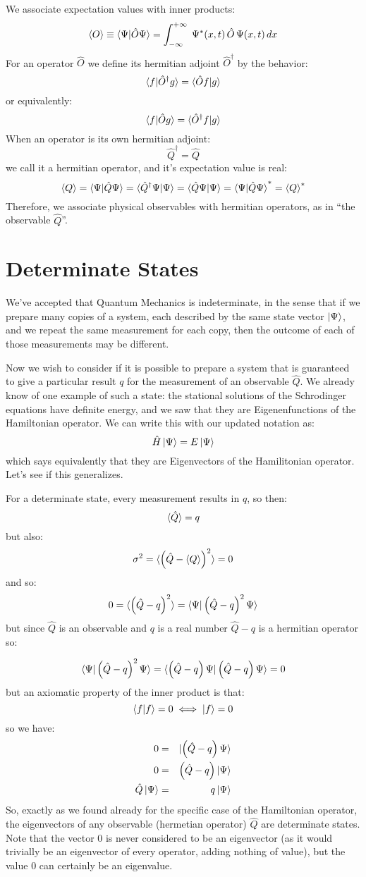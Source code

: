 \documentclass[12pt]{book}
\begin{document}
We associate expectation values with inner products:
$$\braket{O} \equiv \braket{\Psi|\hat{O}\Psi} = \int_{-\infty}^{+\infty}\; \Psi^*(x,t) \, \hat{O} \, \Psi(x,t) \, dx$$
For an operator $\hat{O}$ we define its hermitian adjoint $\hat{O}^\dagger$ by the behavior:
$$\braket{f|\hat{O}^\dagger g} = \braket{\hat{O} f| g}$$
or equivalently:
$$\braket{f|\hat{O} g} = \braket{\hat{O}^\dagger f| g}$$
When an operator is its own hermitian adjoint:
$$\hat{Q}^\dagger = \hat{Q}$$
we call it a hermitian operator, and it's expectation value is real:
$$\braket{Q} = \braket{\Psi|\hat{Q}\Psi} = \braket{\hat{Q}^\dagger \Psi|\Psi}=\braket{\hat{Q}\Psi|\Psi}=\braket{\Psi|\hat{Q}\Psi}^* = \braket{Q}^*$$
Therefore, we associate physical observables with hermitian operators, as in ``the observable $\hat{Q}$''.


\section{Determinate States}

We've accepted that Quantum Mechanics is indeterminate, in the sense
that if we prepare many copies of a system, each described by the same
state vector $\ket{\Psi}$, and we repeat the same measurement for each
copy, then the outcome of each of those measurements may be different.

Now we wish to consider if it is possible to prepare a system that is
guaranteed to give a particular result $q$ for the measurement of an observable $\hat{Q}$.  We already know of one example of such a state:  the stational solutions of the Schrodinger equations have definite energy, and we saw that they are Eigenenfunctions of the Hamiltonian operator.  We can write this with our updated notation as:
$$\hat{H} \ket{\Psi} = E \ket{\Psi}$$
which says equivalently that they are Eigenvectors of the Hamilitonian operator.  Let's see if this generalizes.

For a determinate state, every measurement results in $q$, so then:
$$\braket{\hat{Q}} = q$$
but also:
$$\sigma^2 = \braket{\left(\hat{Q}-\braket{Q}\right)^2} = 0$$
and so:
$$0 = \braket{\left(\hat{Q}-q\right)^2} = \braket{\Psi|\left(\hat{Q}-q\right)^2\Psi}$$
but since $\hat{Q}$ is an observable and $q$ is a real number $\hat{Q}-q$ is a hermitian operator so:

$$\braket{\Psi|\left(\hat{Q}-q\right)^2\Psi} = \braket{\left(\hat{Q}-q\right)\Psi|\left(\hat{Q}-q\right)\Psi} = 0$$
but an axiomatic property of the inner product is that:
$$\braket{f|f} = 0 \iff \ket{f} = 0$$
so we have:
\begin{eqnarray*}
 0 &=& \ket{\left(\hat{Q}-q\right)\Psi}\\
 0 &=& \left(\hat{Q}-q\right)\ket{\Psi}\\
\hat{Q}\ket{\Psi} &=& q \ket{\Psi}\\
\end{eqnarray*}
So, exactly as we found already for the specific case of the Hamiltonian operator, the eigenvectors of any observable (hermetian operator) $\hat{Q}$ are determinate states.
Note that the vector $0$ is never considered to be an eigenvector (as
it would trivially be an eigenvector of every operator, adding nothing
of value), but the value $0$ can certainly be an eigenvalue.  
\end{document}
